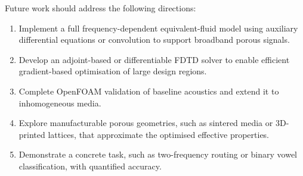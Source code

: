 Future work should address the following directions:
\begin{enumerate}
    \item Implement a full frequency-dependent equivalent-fluid model using auxiliary differential equations or convolution to support broadband porous signals.
    \item Develop an adjoint-based or differentiable FDTD solver to enable efficient gradient-based optimisation of large design regions.
    \item Complete OpenFOAM validation of baseline acoustics and extend it to inhomogeneous media.
    \item Explore manufacturable porous geometries, such as sintered media or 3D-printed lattices, that approximate the optimised effective properties.
    \item Demonstrate a concrete task, such as two-frequency routing or binary vowel classification, with quantified accuracy.
\end{enumerate}
